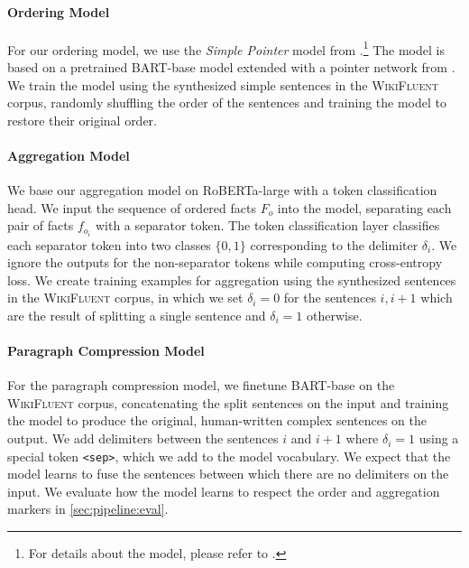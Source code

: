 \paragraph{Ordering Model}
For our ordering model, we use the \emph{Simple Pointer} model from \citet{calizzano2021ordering}.\footnote{For details about the model, please refer to \citet{calizzano2021ordering}.} The model is based on a pretrained BART-base model \cite{lewisBARTDenoisingSequencetoSequence2019} extended with a pointer network from \citet{wang2019hierarchical}. We train the model using the synthesized simple sentences in the \textsc{WikiFluent} corpus, randomly shuffling the order of the sentences and training the model to restore their original order.

\paragraph{Aggregation Model}
We base our aggregation model on RoBERTa-large \cite{liuRoBERTaRobustlyOptimized2019} with a token classification head. We input the sequence of ordered facts $F_o$ into the model, separating each pair of facts $f_{o_i}$ with a separator token. The token classification layer classifies each separator token into two classes $\{0,1\}$ corresponding to the delimiter $\delta_i$. We ignore the outputs for the non-separator tokens while computing cross-entropy loss. We create training examples for aggregation using the synthesized sentences in the \textsc{WikiFluent} corpus, in which we set $\delta_i=0$ for the sentences $i,i+1$ which are the result of splitting a single sentence and $\delta_i=1$ otherwise.

\paragraph{Paragraph Compression Model} For the paragraph compression model, we finetune BART-base \cite{lewisBARTDenoisingSequencetoSequence2019} on the \textsc{WikiFluent} corpus, concatenating the split sentences on the input and training the model to produce the original, human-written complex sentences on the output. We add delimiters between the sentences $i$ and $i+1$ where $\delta_i=1$ using a special token \texttt{<sep>}, which we add to the model vocabulary. We expect that the model learns to fuse the sentences between which there are no delimiters on the input. We evaluate how the model learns to respect the order and aggregation markers in \autoref{sec:pipeline:eval}.


